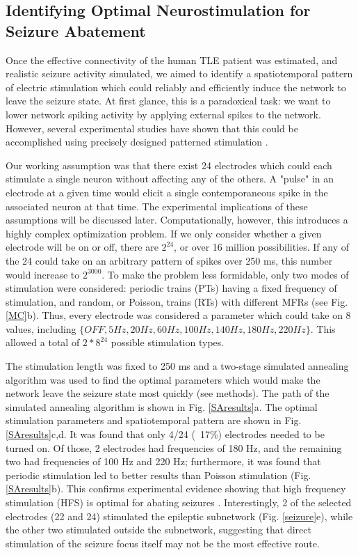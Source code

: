 \documentclass[journal,twoside,web]{ieeecolor}
\newcommand{\nn}{24}    %
\newcommand{\len}{250}   %
\begin{document}
    \subsection{Identifying Optimal Neurostimulation for Seizure Abatement}

Once the effective connectivity of the human TLE patient was estimated, and realistic seizure activity simulated, we aimed to identify a spatiotemporal pattern of electric stimulation which could reliably and efficiently induce the network to leave the seizure state.
At first glance, this is a paradoxical task: we want to lower network spiking activity by applying external spikes to the network.
However, several experimental studies have shown that this could be accomplished using precisely designed patterned stimulation \cite{durand01,heck14}.

Our working assumption was that there exist \nn{} electrodes which could each stimulate a single neuron without affecting any of the others.
A "pulse" in an electrode at a given time would elicit a single contemporaneous spike in the associated neuron at that time.
The experimental implications of these assumptions will be discussed later.
Computationally, however, this introduces a highly complex optimization problem.
If we only consider whether a given electrode will be on or off, there are $2^{\nn{}}$, or over 16 million possibilities.
If any of the \nn{} could take on an arbitrary pattern of spikes over \len{} ms, this number would increase to $2^{3000}$.
To make the problem less formidable, only two modes of stimulation were considered: periodic trains (PTs) having a fixed frequency of stimulation, and random, or Poisson, trains (RTs) with different MFRs (see Fig. \ref{MC}b).
Thus, every electrode was considered a parameter which could take on 8 values, including $\{OFF, 5 Hz, 20 Hz, 60 Hz, 100 Hz, 140 Hz, 180 Hz, 220 Hz\}$.
This allowed a total of $2*8^{\nn{}}$ possible stimulation types.

The stimulation length was fixed to \len{} ms and a two-stage simulated annealing algorithm was used to find the optimal parameters which would make the network leave the seizure state most quickly (see methods).
The path of the simulated annealing algorithm is shown in Fig. \ref{SAresults}a.
The optimal stimulation parameters and spatiotemporal pattern are shown in Fig. \ref{SAresults}c,d.
It was found that only 4/\nn{} (~17\%) electrodes needed to be turned on.
Of those, 2 electrodes had frequencies of 180 Hz, and the remaining two had frequencies of 100 Hz and 220 Hz; furthermore, it was found that periodic stimulation led to better results than Poisson stimulation (Fig. \ref{SAresults}b).
This confirms experimental evidence showing that high frequency stimulation (HFS) is optimal for abating seizures \cite{durand01}.
Interestingly, 2 of the selected electrodes (22 and 24) stimulated the epileptic subnetwork (Fig. \ref{seizure}e), while the other two stimulated outside the subnetwork, suggesting that direct stimulation of the seizure focus itself may not be the most effective route.
\end{document}
